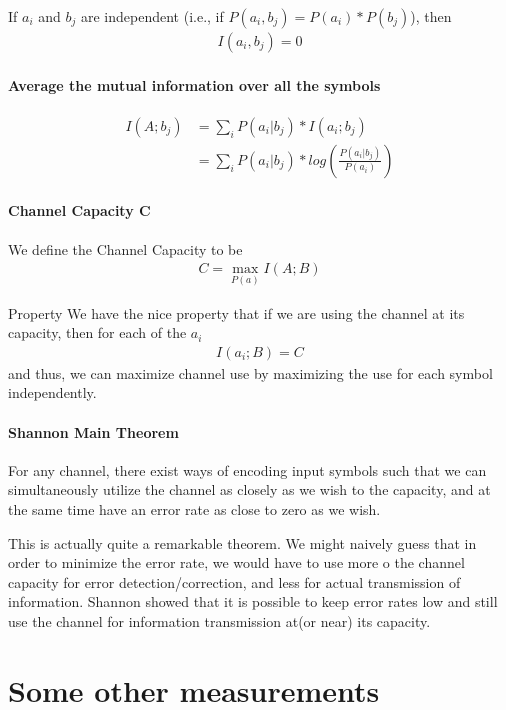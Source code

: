 \documentclass[10 pt,final]{article}
\newcommand{\impo}[1]{{\color{magenta} #1}}
\newcommand{\question}[1]{{\color{blue} #1}}
\begin{document}
If $a_i$ and $b_j$ are independent (i.e., if $P(a_i,b_j) = P(a_i) * P(b_j)$), then 
\begin{align*}
I(a_i, b_j) = 0
\end{align*}

\paragraph{Average the mutual information over all the symbols}
\begin{align*}
I(A; b_j) & = \sum_i P(a_i|b_j)*I(a_i;b_j) \\
& =\sum_i P(a_i |b_j) * log(\frac{P(a_i|b_j)}{P(a_i)})
\end{align*}

\paragraph{Channel Capacity C} We define the Channel Capacity to be 
\begin{align*}
C = \max_{P(a)} I(A;B)
\end{align*}

\question{Property} We have the nice property that if we are using the channel at its capacity, then for each of the $a_i$
\begin{align*}
I(a_i;B) = C
\end{align*}
and thus, \impo{we can maximize channel use by maximizing the use for each symbol independently}.

\paragraph{Shannon Main Theorem} For any channel, there exist ways of \impo{encoding input symbols} such that we can simultaneously utilize the channel as closely as we wish to the capacity, and at the same time have an error rate as close to zero as we wish.

This is actually quite a remarkable theorem. We might naively guess that in order to minimize the error rate, we would have to use more o the channel capacity for error detection/correction, and less for actual transmission of information. \impo{Shannon showed that it is possible to keep error rates low and still use the channel for information transmission at(or near) its capacity}.
\section{Some other measurements}
\end{document}
